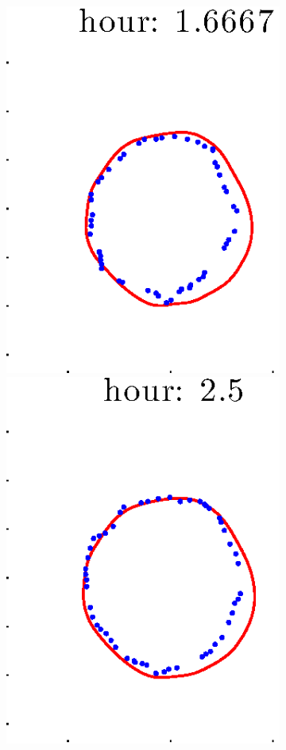 \documentclass[12pt]{article}
\begin{document}
\begin{figure}[h!]
\begin{subfigure}[b]{.3\textwidth}
		\includegraphics[height=.15\textheight]{Pos14exp8/secondhalf/full3.eps}
		\includegraphics[height=.15\textheight]{Pos14exp8/secondhalf/full4.eps}

\end{subfigure}
\end{figure}
\end{document}
